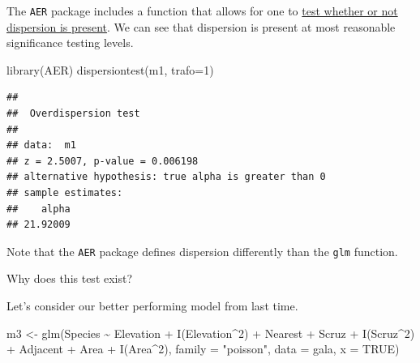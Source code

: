 \documentclass[
  ignorenonframetext,
]{beamer}
\newenvironment{Shaded}{\begin{snugshade}}{\end{snugshade}}
\newcommand{\AttributeTok}[1]{\textcolor[rgb]{0.77,0.63,0.00}{#1}}
\newcommand{\ConstantTok}[1]{\textcolor[rgb]{0.00,0.00,0.00}{#1}}
\newcommand{\DecValTok}[1]{\textcolor[rgb]{0.00,0.00,0.81}{#1}}
\newcommand{\FunctionTok}[1]{\textcolor[rgb]{0.00,0.00,0.00}{#1}}
\newcommand{\NormalTok}[1]{#1}
\newcommand{\OtherTok}[1]{\textcolor[rgb]{0.56,0.35,0.01}{#1}}
\newcommand{\SpecialCharTok}[1]{\textcolor[rgb]{0.00,0.00,0.00}{#1}}
\newcommand{\StringTok}[1]{\textcolor[rgb]{0.31,0.60,0.02}{#1}}
\begin{document}
\begin{frame}[fragile]{}
\protect\hypertarget{section-8}{}
The \texttt{AER} package includes a function that allows for one to
\href{https://www.sciencedirect.com/science/article/abs/pii/030440769090014K}{test
whether or not dispersion is present}. We can see that dispersion is
present at most reasonable significance testing levels.

\vspace{12pt}
\tiny

\begin{Shaded}
\begin{Highlighting}[]
\FunctionTok{library}\NormalTok{(AER)}
\FunctionTok{dispersiontest}\NormalTok{(m1, }\AttributeTok{trafo=}\DecValTok{1}\NormalTok{)}
\end{Highlighting}
\end{Shaded}

\begin{verbatim}
## 
##  Overdispersion test
## 
## data:  m1
## z = 2.5007, p-value = 0.006198
## alternative hypothesis: true alpha is greater than 0
## sample estimates:
##    alpha 
## 21.92009
\end{verbatim}

\vspace{12pt}
\normalsize

Note that the \texttt{AER} package defines dispersion differently than
the \texttt{glm} function.

\vspace{12pt}

Why does this test exist?
\end{frame}

\begin{frame}[fragile]{}
\protect\hypertarget{section-9}{}
Let's consider our better performing model from last time.

\vspace{12pt}
\tiny

\begin{Shaded}
\begin{Highlighting}[]
\NormalTok{m3 }\OtherTok{\textless{}{-}} \FunctionTok{glm}\NormalTok{(Species }\SpecialCharTok{\textasciitilde{}}\NormalTok{ Elevation }\SpecialCharTok{+} \FunctionTok{I}\NormalTok{(Elevation}\SpecialCharTok{\^{}}\DecValTok{2}\NormalTok{) }\SpecialCharTok{+}\NormalTok{ Nearest }\SpecialCharTok{+}\NormalTok{ Scruz }\SpecialCharTok{+} 
          \FunctionTok{I}\NormalTok{(Scruz}\SpecialCharTok{\^{}}\DecValTok{2}\NormalTok{) }\SpecialCharTok{+}\NormalTok{ Adjacent }\SpecialCharTok{+}\NormalTok{ Area }\SpecialCharTok{+} \FunctionTok{I}\NormalTok{(Area}\SpecialCharTok{\^{}}\DecValTok{2}\NormalTok{), }
          \AttributeTok{family =} \StringTok{"poisson"}\NormalTok{, }\AttributeTok{data =}\NormalTok{ gala, }\AttributeTok{x =} \ConstantTok{TRUE}\NormalTok{)}
\end{Highlighting}
\end{Shaded}
\end{frame}
\end{document}
